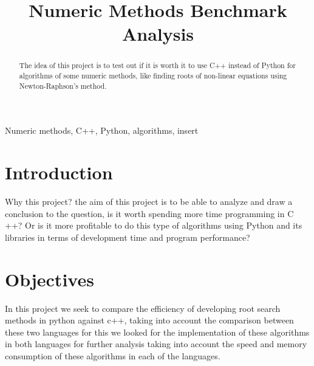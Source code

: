 \documentclass[conference]{IEEEtran}
\begin{document}
\title{Numeric Methods Benchmark Analysis}

\author{
\and
{}
}

\maketitle

\begin{abstract}
The idea of this project is to test out if it is worth it to use C++ instead of Python for
algorithms of some numeric methods, like finding roots of non-linear equations using
Newton-Raphson's method.
\end{abstract}

\begin{IEEEkeywords}
Numeric methods, C++, Python, algorithms, insert
\end{IEEEkeywords}

\section{Introduction}
Why this project? the aim of this project is to be able to analyze and draw a conclusion to 
the question, is it worth spending more time programming in C ++? Or is it more profitable to do 
this type of algorithms using Python and its libraries in terms of development time and program performance?

\section{Objectives}
In this project we seek to compare the efficiency of developing root search methods in python against c++, taking into account the comparison between these two languages for this we looked for the implementation of these algorithms in both languages for further analysis taking into account the speed and memory consumption of these algorithms in each of the languages.
\end{document}
